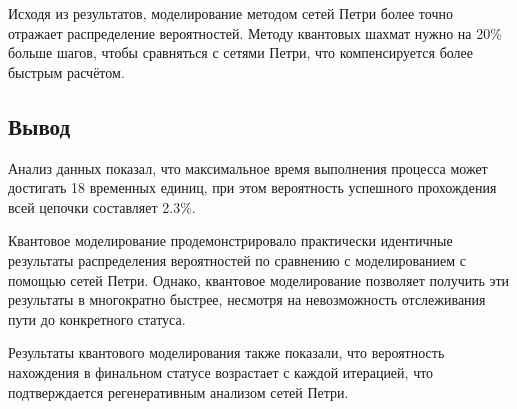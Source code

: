 Исходя из результатов, моделирование методом сетей Петри более точно отражает распределение вероятностей. Методу квантовых шахмат нужно на 20\% больше шагов, чтобы сравняться с сетями Петри, что компенсируется более быстрым расчётом.

\subsection{Вывод}

Анализ данных показал, что максимальное время выполнения процесса может достигать 18 временных единиц, при этом вероятность успешного прохождения всей цепочки составляет 2.3\%.

Квантовое моделирование продемонстрировало практически идентичные результаты распределения вероятностей по сравнению с моделированием с помощью сетей Петри. Однако, квантовое моделирование позволяет получить эти результаты в многократно быстрее, несмотря на невозможность отслеживания пути до конкретного статуса.

Результаты квантового моделирования также показали, что вероятность нахождения в финальном статусе возрастает с каждой итерацией, что подтверждается регенеративным анализом сетей Петри.

\clearpage